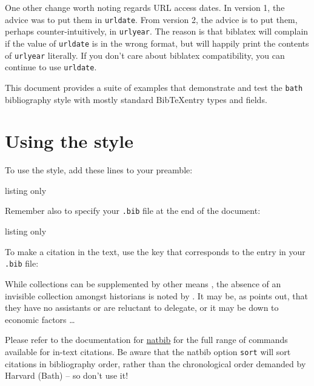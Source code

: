 \documentclass[10pt,a4paper]{article}
\newcommand*{\urlprefix}{Available from: }
\newcommand*{\urldateprefix}{Accessed }
\begin{document}
One other change worth noting regards URL access dates. In version 1, the
advice was to put them in \texttt{urldate}. From version 2, the advice is
to put them, perhaps counter-intuitively, in \texttt{urlyear}. The reason is that
\textsf{biblatex} will complain if the value of \texttt{urldate} is in the wrong
format, but will happily print the contents of \texttt{urlyear} literally. If
you don't care about \textsf{biblatex} compatibility, you can continue to use
\texttt{urldate}.

This document provides a suite of examples that demonstrate and test the
\texttt{bath} bibliography style with mostly standard Bib\TeX entry types
and fields.

\section{Using the style}

To use the style, add these lines to your preamble:

\begin{tcblisting}{listing only}
\usepackage{natbib}
\newcommand*{\urlprefix}{Available from: }
\newcommand*{\urldateprefix}{Accessed }

\end{tcblisting}

Remember also to specify your \texttt{.bib} file at the end of the document:

\begin{tcblisting}{listing only}

\end{tcblisting}

To make a citation in the text, use the key that corresponds to the entry in your \texttt{.bib} file:

\begin{tcblisting}{}
While collections can be supplemented by other means \citep{devlin.etal2021ipp},
the absence of an invisible collection amongst historians is noted by
\citet[p.556]{stieg1981inh}. It may be, as \citet{burchard1965hhl} points out,
that they have no assistants or are reluctant to delegate, or it may be
down to economic factors \citep{adams2009tc1, adams2014tc2, gb.pa2014,
adams2017tc3}\dots
\end{tcblisting}

Please refer to the documentation for \href{http://www.ctan.org/pkg/natbib}{\textsf{natbib}}
for the full range of commands available for in-text citations. Be aware that the
\textsf{natbib} option \texttt{sort} will sort citations in bibliography order,
rather than the chronological order demanded by Harvard (Bath) -- so don't use it!
\end{document}
